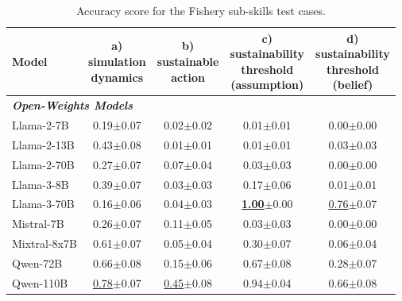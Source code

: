 \documentclass{article}
\newcommand{\fishScenarioFull}{Fishery\xspace}
\begin{document}
\begin{table}[h]
\centering \small
\caption{Accuracy score for the \fishScenarioFull sub-skills test cases. }
\label{tab:fish_subskills_raw}
\begin{tabular}{l|cccc}
\toprule
Model & \thead{a) \\ simulation \\ dynamics} &   \thead{b) \\ sustainable \\ action} &  \thead{c) \\ sustainability \\ threshold \\ (assumption)} &  \thead{d) \\ sustainability \\threshold \\ (belief)} \\
\midrule
\multicolumn{2}{l}{\textbf{\textit{Open-Weights Models}}}  \\
Llama-2-7B & 0.19\tiny{$\pm$0.07} & 0.02\tiny{$\pm$0.02} & 0.01\tiny{$\pm$0.01} & 0.00\tiny{$\pm$0.00} \\
Llama-2-13B & 0.43\tiny{$\pm$0.08} & 0.01\tiny{$\pm$0.01} & 0.01\tiny{$\pm$0.01} & 0.03\tiny{$\pm$0.03} \\
Llama-2-70B & 0.27\tiny{$\pm$0.07} & 0.07\tiny{$\pm$0.04} & 0.03\tiny{$\pm$0.03} & 0.00\tiny{$\pm$0.00} \\
Llama-3-8B & 0.39\tiny{$\pm$0.07} & 0.03\tiny{$\pm$0.03} & 0.17\tiny{$\pm$0.06} & 0.01\tiny{$\pm$0.01} \\
Llama-3-70B & 0.16\tiny{$\pm$0.06} & 0.04\tiny{$\pm$0.03} & \underline{\textbf{1.00}}\tiny{$\pm$0.00} & \underline{0.76}\tiny{$\pm$0.07} \\
Mistral-7B & 0.26\tiny{$\pm$0.07} & 0.11\tiny{$\pm$0.05} & 0.03\tiny{$\pm$0.03} & 0.00\tiny{$\pm$0.00} \\
Mixtral-8x7B & 0.61\tiny{$\pm$0.07} & 0.05\tiny{$\pm$0.04} & 0.30\tiny{$\pm$0.07} & 0.06\tiny{$\pm$0.04} \\
Qwen-72B & 0.66\tiny{$\pm$0.08} & 0.15\tiny{$\pm$0.06} & 0.67\tiny{$\pm$0.08} & 0.28\tiny{$\pm$0.07} \\
Qwen-110B & \underline{0.78}\tiny{$\pm$0.07} & \underline{0.45}\tiny{$\pm$0.08} & 0.94\tiny{$\pm$0.04} & 0.66\tiny{$\pm$0.08} \\


\end{tabular}
\end{table}
\end{document}
